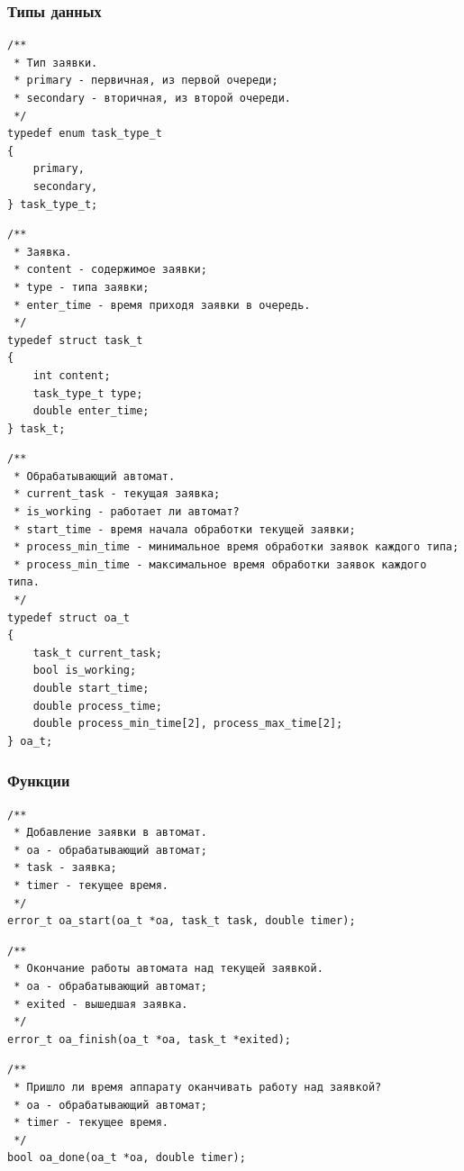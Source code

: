 \documentclass[a4paper,12pt]{extarticle}
\begin{document}
\subsubsection{Типы данных}

\begin{verbatim}
/**
 * Тип заявки.
 * primary - первичная, из первой очереди;
 * secondary - вторичная, из второй очереди.
 */
typedef enum task_type_t
{
    primary,
    secondary,
} task_type_t;
\end{verbatim}

\begin{verbatim}
/**
 * Заявка.
 * content - содержимое заявки;
 * type - типа заявки;
 * enter_time - время приходя заявки в очередь.
 */
typedef struct task_t
{
    int content;
    task_type_t type;
    double enter_time;
} task_t;
\end{verbatim}

\begin{verbatim}
/**
 * Обрабатывающий автомат.
 * current_task - текущая заявка;
 * is_working - работает ли автомат?
 * start_time - время начала обработки текущей заявки;
 * process_min_time - минимальное время обработки заявок каждого типа;
 * process_min_time - максимальное время обработки заявок каждого типа.
 */
typedef struct oa_t
{
    task_t current_task;
    bool is_working;
    double start_time;
    double process_time;
    double process_min_time[2], process_max_time[2];
} oa_t;
\end{verbatim}

\subsubsection{Функции}

\begin{verbatim}
/**
 * Добавление заявки в автомат.
 * oa - обрабатывающий автомат;
 * task - заявка;
 * timer - текущее время.
 */
error_t oa_start(oa_t *oa, task_t task, double timer);
\end{verbatim}

\begin{verbatim}
/**
 * Окончание работы автомата над текущей заявкой.
 * oa - обрабатывающий автомат;
 * exited - вышедшая заявка.
 */
error_t oa_finish(oa_t *oa, task_t *exited);
\end{verbatim}

\begin{verbatim}
/**
 * Пришло ли время аппарату оканчивать работу над заявкой?
 * oa - обрабатывающий автомат;
 * timer - текущее время.
 */
bool oa_done(oa_t *oa, double timer);
\end{verbatim}
\end{document}

